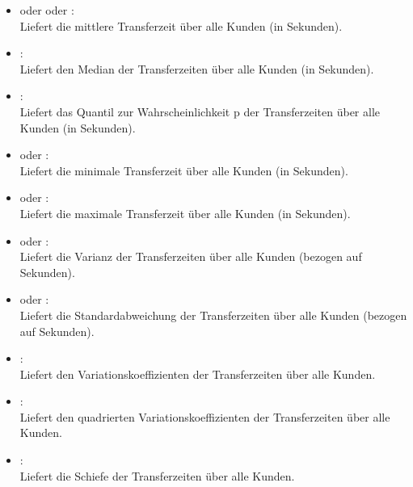\begin{itemize}

\item
{} oder  oder :\\
Liefert die mittlere Transferzeit über alle Kunden (in Sekunden).

\item
{}:\\
Liefert den Median der Transferzeiten über alle Kunden (in Sekunden).

\item
{}:\\
Liefert das Quantil zur Wahrscheinlichkeit p der Transferzeiten über alle Kunden (in Sekunden).

\item
{} oder :\\
Liefert die minimale Transferzeit über alle Kunden (in Sekunden).

\item
{} oder :\\
Liefert die maximale Transferzeit über alle Kunden (in Sekunden).

\item
{} oder :\\
Liefert die Varianz der Transferzeiten über alle Kunden (bezogen auf Sekunden).

\item
{} oder :\\
Liefert die Standardabweichung der Transferzeiten über alle Kunden (bezogen auf Sekunden).

\item
{}:\\
Liefert den Variationskoeffizienten der Transferzeiten über alle Kunden.

\item
{}:\\
Liefert den quadrierten Variationskoeffizienten der Transferzeiten über alle Kunden.

\item
{}:\\
Liefert die Schiefe der Transferzeiten über alle Kunden.


\end{itemize}
